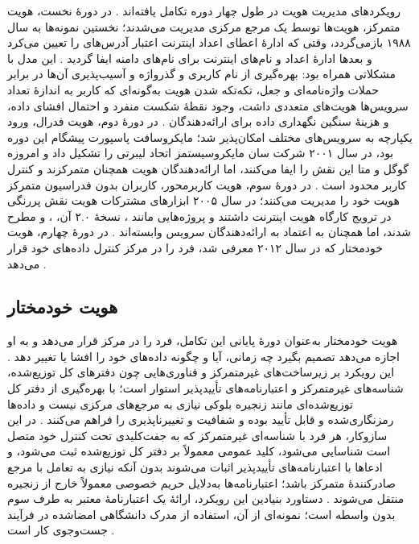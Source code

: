 \documentclass[12pt,a4paper]{article}
\begin{document}
رویکرد‌های مدیریت هویت در طول چهار دوره تکامل یافته‌اند \cite{mazzocca2025survey}. در دورهٔ نخست، هویت متمرکز، هویت‌ها توسط یک مرجع مرکزی مدیریت می‌شدند؛ نخستین نمونه‌ها به سال ۱۹۸۸ بازمی‌گردد، وقتی که ادارهٔ اعطای اعداد اینترنت  اعتبار آدرس‌های  را تعیین می‌کرد و بعدها ادارهٔ اعداد و نام‌های اینترنت  برای نام‌های دامنه ایفا گردید \cite{mazzocca2025survey}. این مدل با مشکلاتی همراه بود: بهره‌گیری از نام کاربری و گذرواژه و آسیب‌پذیری آن‌ها در برابر حملات واژه‌نامه‌ای و جعل، تکه‌تکه شدن هویت به‌گونه‌ای که کاربر به اندازهٔ تعداد سرویس‌ها هویت‌های متعددی داشت، وجود نقطهٔ شکست منفرد و احتمال افشای داده، و هزینهٔ سنگین نگهداری داده برای ارائه‌دهندگان \cite{mazzocca2025survey}. در دورهٔ دوم، هویت فدرال، ورود یکپارچه به سرویس‌های مختلف  امکان‌پذیر شد؛ مایکروسافت پاسپورت پیشگام این دوره بود، در سال ۲۰۰۱ شرکت سان مایکروسیستمز اتحاد لیبرتی  را تشکیل داد و امروزه گوگل و متا این نقش را ایفا می‌کنند، اما ارائه‌دهندگان هویت همچنان متمرکزند و کنترل کاربر محدود است \cite{mazzocca2025survey}. در دورهٔ سوم، هویت کاربرمحور، کاربران بدون فدراسیون متمرکز هویت خود را مدیریت می‌کنند؛ در سال ۲۰۰۵ ابزار‌های مشترکات هویت  نقش پررنگی در ترویج کارگاه هویت اینترنت  داشتند و پروژه‌هایی مانند ، نسخهٔ ۲.۰ آن، ،  و  مطرح شدند، اما همچنان به اعتماد به ارائه‌دهندگان سرویس وابسته‌اند \cite{mazzocca2025survey}. در دورهٔ چهارم، هویت خودمختار که در سال ۲۰۱۲ معرفی شد، فرد را در مرکز کنترل داده‌های خود قرار می‌دهد \cite{mazzocca2025survey}.

\subsection{هویت خودمختار }

هویت خودمختار  به‌عنوان دورهٔ پایانی این تکامل، فرد را در مرکز قرار می‌دهد و به او اجازه می‌دهد تصمیم بگیرد چه زمانی، آیا و چگونه داده‌های خود را افشا یا تغییر دهد \cite{mazzocca2025survey}. این رویکرد بر زیرساخت‌های غیرمتمرکز و فناوری‌هایی چون دفتر‌های کل توزیع‌شده، شناسه‌های غیرمتمرکز و اعتبارنامه‌های تأییدپذیر استوار است؛ با بهره‌گیری از دفتر کل توزیع‌شده‌ای مانند زنجیره بلوکی نیازی به مرجع‌های مرکزی نیست و داده‌ها رمزنگاری‌شده و قابل تأیید بوده و شفافیت و تغییرناپذیری را فراهم می‌کنند \cite{mazzocca2025survey}. در این سازوکار، هر فرد با شناسه‌ای غیرمتمرکز که به جفت‌کلیدی تحت کنترل خود متصل است شناسایی می‌شود، کلید عمومی معمولاً بر دفتر کل توزیع‌شده ثبت می‌شود، و ادعا‌ها با اعتبارنامه‌های تأییدپذیر اثبات می‌شوند بدون آنکه نیازی به تعامل با مرجع صادرکنندهٔ متمرکز باشد؛ اعتبارنامه‌ها به‌دلایل حریم خصوصی معمولاً خارج از زنجیره منتقل می‌شوند \cite{mazzocca2025survey}. دستاورد بنیادین این رویکرد، ارائهٔ یک اعتبارنامهٔ معتبر به طرف سوم بدون واسطه است؛ نمونه‌ای از آن، استفاده از مدرک دانشگاهی امضا‌شده در فرآیند جست‌وجوی کار است \cite{mazzocca2025survey}.
\end{document}
